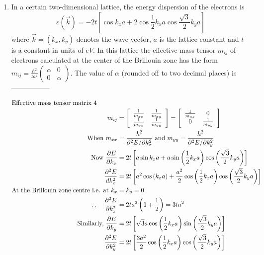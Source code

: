 \begin{enumerate}
	\item In a certain two-dimensional lattice, the energy dispersion of the electrons is
	$$
	\varepsilon(\vec{k})=-2 t\left[\cos k_{x} a+2 \cos \frac{1}{2} k_{x} a \cos \frac{\sqrt{3}}{2} k_{y} a\right]
	$$
	where $\vec{k}=\left(k_{x}, k_{y}\right)$ denotes the wave vector, $a$ is the lattice constant and $t$ is a constant in units of $e V .$ In this lattice the effective mass tensor $m_{i j}$ of electrons calculated at the center of the Brillouin zone has the form $m_{i j}=\frac{\hbar^{2}}{t a^{2}}\left(\begin{array}{cc}\alpha & 0 \\ 0 & \alpha\end{array}\right) .$ The value of $\alpha$ (rounded off to two decimal places) is-----------------
	{	}
	\begin{answer}
		\begin{align*}
		\intertext{Effective mass tensor matrix 4}
		m_{i j}&=\left[\begin{array}{cc}\frac{1}{m_{x x}} & \frac{1}{m_{x y}} \\ \frac{1}{m_{y x}} & \frac{1}{m_{y y}}\end{array}\right]=\left[\begin{array}{cc}\frac{1}{m_{x x}} & 0 \\ 0 & \frac{1}{m_{y y}}\end{array}\right]\\
		\text{	When }m_{x x}&=\frac{\hbar^{2}}{\partial^{2} E / \partial k_{x}^{2}}\text{ and }m_{y y}=\frac{\hbar^{2}}{\partial^{2} E / \partial k_{y}^{2}}\\
		\text{Now }\frac{\partial E}{\partial k_{x}}&=2 t\left[a \sin k_{x} a+a \sin \left(\frac{1}{2} k_{x} a\right) \cos \left(\frac{\sqrt{3}}{2} k_{y} a\right)\right]\\
		\frac{\partial^{2} E}{d k_{x}^{2}}&=2 t\left[a^{2} \cos \left(k_{x} a\right)+\frac{a^{2}}{2} \cos \left(\frac{1}{2} k_{x} a\right) \cos \left(\frac{\sqrt{3}}{2} k_{y} a\right)\right]\\
		\text{At the Brillouin zone centre i.e. at }k_{x}&=k_{y}=0\\
		\therefore \quad \frac{\partial^{2} E}{\partial k_{x}^{2}}&=2 t a^{2}\left(1+\frac{1}{2}\right)=3 t a^{2}\\
		\text{Similarly, }\frac{\partial E}{\partial k_{y}}&=2 t\left[\sqrt{3} a \cos \left(\frac{1}{2} k_{x} a\right) \sin \left(\frac{\sqrt{3}}{2} k_{y} a\right)\right]\\
		\frac{\partial^{2} E}{\partial k_{y}^{2}}&=2 t\left[\frac{3 a^{2}}{2} \cos \left(\frac{1}{2} k_{x} a\right) \cos \left(\frac{\sqrt{3}}{2} k_{y} a\right)\right]\\

\end{align*}
\end{answer}
\end{enumerate}
